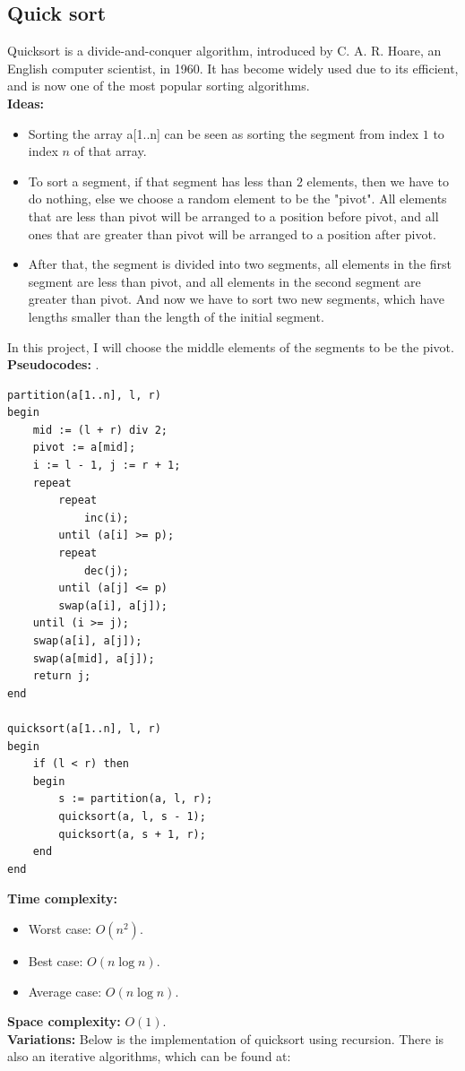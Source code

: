 \documentclass[12pt,a4paper]{article}
\begin{document}
\subsection{Quick sort}
Quicksort is a divide-and-conquer algorithm, introduced by C. A. R. Hoare, an English computer scientist, in 1960. It has become widely used due to its efficient, and is now one of the most popular sorting algorithms.\\
\textbf{Ideas:} \begin{itemize}
\item Sorting the array a[1..n] can be seen as sorting the segment from index $1$ to index $n$ of that array.
\item To sort a segment, if that segment has less than $2$ elements, then we have to do nothing, else we choose a random element to be the "pivot". All elements that are less than pivot will be arranged to a position before pivot, and all ones that are greater than pivot will be arranged to a position after pivot.
\item After that, the segment is divided into two segments, all elements in the first segment are less than pivot, and all elements in the second segment are greater than pivot. And now we have to sort two new segments, which have lengths smaller than the length of the initial segment.
\end{itemize}
In this project, I will choose the middle elements of the segments to be the pivot.\\
\textbf{Pseudocodes:} \cite{thayP}. 
\lstset{language=Pascal} 
\begin{lstlisting}[caption = {Quick sort}]
partition(a[1..n], l, r) 
begin
	mid := (l + r) div 2;
	pivot := a[mid];
	i := l - 1, j := r + 1;
	repeat 
		repeat
			inc(i);
		until (a[i] >= p);
		repeat
			dec(j);
		until (a[j] <= p)
		swap(a[i], a[j]);
	until (i >= j);
	swap(a[i], a[j]);
	swap(a[mid], a[j]);
	return j;
end

quicksort(a[1..n], l, r)
begin
	if (l < r) then
	begin
		s := partition(a, l, r);	
		quicksort(a, l, s - 1);
		quicksort(a, s + 1, r);
	end
end
\end{lstlisting}
\textbf{Time complexity:} \cite{quick}
\begin{itemize}
\item Worst case: $O \left( {n^2} \right).$
\item Best case: $O \left( {n \log n} \right).$
\item Average case: $O \left( {n \log n} \right).$
\end{itemize}
\textbf{Space complexity:} $O \left( {1} \right).$ \cite{quick}\\
\textbf{Variations:} Below is the implementation of quicksort using recursion. There is also an iterative algorithms, which can be found at: \cite{itequick} 
\end{document}
